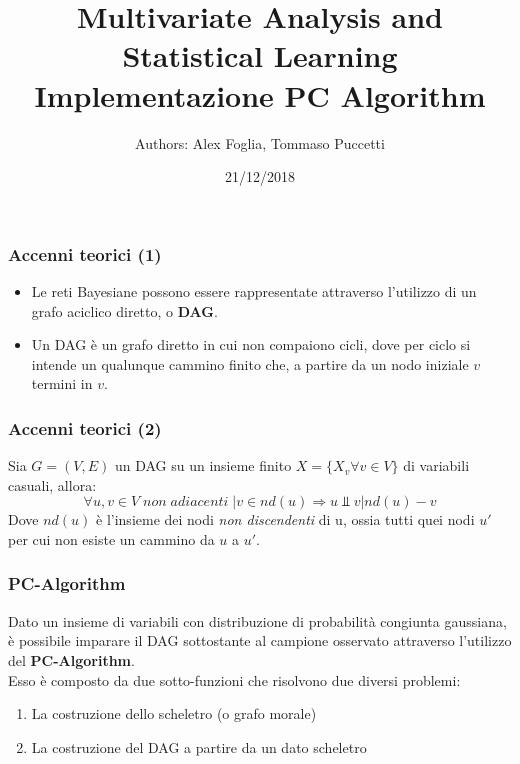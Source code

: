 \documentclass[xcolor ={table,usenames,dvipsnames}]{beamer}
\title{Multivariate Analysis and Statistical Learning \\ Implementazione PC Algorithm}
\author{Authors: Alex Foglia, Tommaso Puccetti}
\institute{Universit\`a  degli Studi di Firenze}
\date{21/12/2018}
\theoremstyle{definition}
\begin{document}
	
	\begin{frame}
		\maketitle
	\end{frame}

	\begin{frame}
		\frametitle{Accenni teorici (1)}
		\begin{itemize}
			\item Le reti Bayesiane possono essere rappresentate attraverso l'utilizzo di un grafo aciclico diretto, o \textbf{DAG}.\\
			\item Un DAG è un grafo diretto in cui non compaiono cicli, dove per ciclo si intende un qualunque cammino finito che, a partire da un nodo iniziale $v$ termini in $v$.
		\end{itemize}
	\end{frame}

	\begin{frame}
		\frametitle{Accenni teorici (2)}
		Sia $G = (V,E)$ un DAG su un insieme finito $X = \{X_v \forall v \in V\}$ di variabili casuali, allora:
		$$
		\forall u,v \in V \;non\;adiacenti\;| v \in nd(u) \Rightarrow u \Perp v | nd(u) - v
		$$
		Dove $nd(u)$ è l'insieme dei nodi \emph{non discendenti} di u, ossia tutti quei nodi $u'$ per cui non esiste un cammino da $u$ a $u'$.\\
	\end{frame}

	\begin{frame}
		\frametitle{PC-Algorithm}
		Dato un insieme di variabili con distribuzione di probabilità congiunta gaussiana, è possibile imparare il DAG sottostante al campione osservato attraverso l'utilizzo del \textbf{PC-Algorithm}.\\
		Esso è composto da due sotto-funzioni che risolvono due diversi problemi:
		\begin{enumerate}
			\item La costruzione dello scheletro (o grafo morale)
			\item La costruzione del DAG a partire da un dato scheletro
		\end{enumerate}
	\end{frame}
\end{document}
